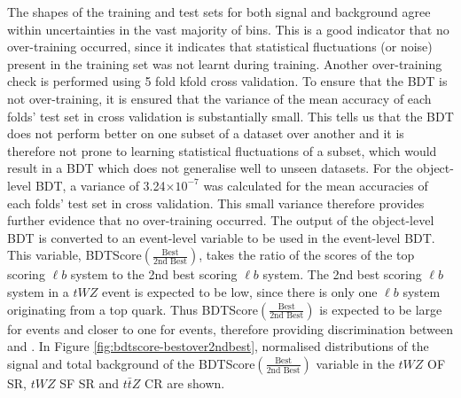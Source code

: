 The shapes of the training and test sets for both signal and background agree within uncertainties in the vast majority of bins. This is a good indicator that no over-training occurred, since it indicates that statistical fluctuations (or noise) present in the training set was not learnt during training. Another over-training check is performed using 5 fold kfold cross validation. To ensure that the BDT is not over-training, it is ensured that the variance of the mean accuracy of each folds' test set in cross validation is substantially small. This tells us that the BDT does not perform better on one subset of a dataset over another and it is therefore not prone to learning statistical fluctuations of a subset, which would result in a BDT which does not generalise well to unseen datasets. For the object-level BDT, a variance of 3.24$\times 10^{-7}$ was calculated for the mean accuracies of each folds' test set in cross validation. This small variance therefore provides further evidence that no over-training occurred. The output of the object-level BDT is converted to an event-level variable to be used in the event-level BDT. This variable, BDTScore$(\frac{\text{Best}}{\text{2nd Best}})$, takes the ratio of the scores of the top scoring $\ell b$ system to the 2nd best scoring $\ell b$ system. The 2nd best scoring $\ell b$ system in a $tWZ$ event is expected to be low, since there is only one $\ell b$ system originating from a top quark. Thus BDTScore$(\frac{\text{Best}}{\text{2nd Best}})$ is expected to be large for \tWZ events and closer to one for \ttZ events, therefore providing discrimination between \tWZ and \ttZ. In Figure \ref{fig:bdtscore-bestover2ndbest}, normalised distributions of the signal and total background of the BDTScore$(\frac{\text{Best}}{\text{2nd Best}})$ variable in the $tWZ$ OF SR, $tWZ$ SF SR and $t\bar{t}Z$ CR are shown.
